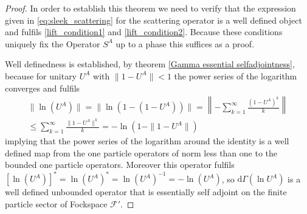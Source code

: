 \documentclass[b5paper,draft,openbib,12pt]{memoir}
\begin{document}
\begin{proof}
In order to establish this theorem we need to verify that the expression given in \eqref{eq:sleek_scattering} for the scattering operator
 is a well defined object
and fulfils \eqref{lift_condition1} and \eqref{lift_condition2}. Because these conditions uniquely fix the Operator \(S^A\)  up to a phase this suffices as a proof.

Well definedness is established, by theorem \ref{Gamma essential selfadjointness}, because for unitary \(U^A\)
with \(\|1-U^A\|<1\) the power series of the logarithm converges and fulfils
\begin{align}
\|\ln(U^A)\|=\|\ln (1-(1-U^A))\|= \left\| -\sum_{k=1}^\infty \frac{(1-U^A)^k}{k} \right\|\\
 \le   \sum_{k=1}^\infty \frac{\|1-U^A\|^k}{k}=-\ln(1-\|1-U^A\|)
\end{align}
implying that the power series of the logarithm around the identity is a well defined map from the one particle operators of norm less than
one to the bounded one particle operators. Moreover this operator fulfils \([\ln (U^A)]^*=\ln (U^A)^*= \ln (U^A)^{-1}=-\ln (U^A)\), so 
\(\mathrm{d}\Gamma(\ln U^A)\) is a well defined unbounded operator that is essentially self adjoint on the finite particle sector of Fockspace \(\mathcal{F}'\).



\end{proof}
\end{document}
